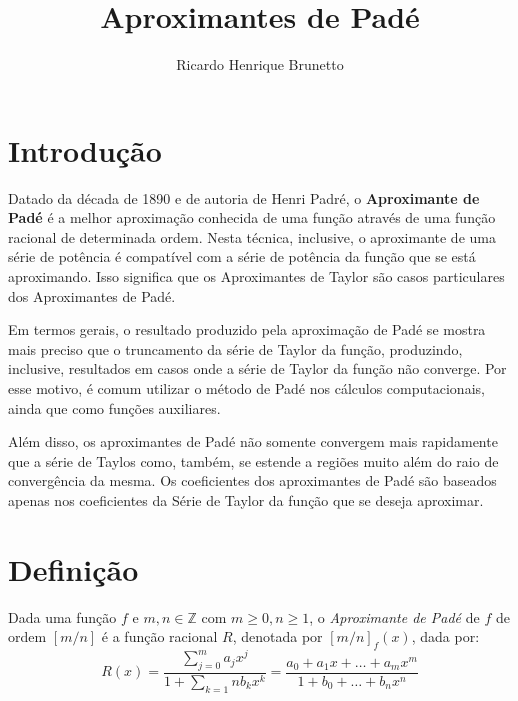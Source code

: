 

\sloppy

\title{Aproximantes de Padé}

\author{Ricardo Henrique Brunetto}

\address{Departamento de Informática -- Universidade Estadual de Maringá (UEM)\\
	Maringá -- PR -- Brasil
}



	\maketitle

  \section{Introdução}

	Datado da década de 1890 e de autoria de Henri Padré,  o \textbf{Aproximante de Padé} é
	a melhor aproximação conhecida  de uma função através de uma função racional de determinada ordem.
	Nesta técnica, inclusive, o aproximante de uma série de potência é compatível com a série de potência
	da função que se está aproximando. Isso significa que os Aproximantes de Taylor são casos particulares dos Aproximantes
	de Padé.

	Em termos gerais, o resultado produzido pela aproximação de Padé se mostra mais preciso
	que o truncamento da série de Taylor da função, produzindo, inclusive, resultados em casos
	onde a série de Taylor da função não converge. Por esse motivo, é comum utilizar o método de
	Padé nos cálculos computacionais, ainda que como funções auxiliares.

	Além disso, os aproximantes de Padé não somente convergem mais rapidamente que a série de Taylos como,
	também, se estende a regiões muito além do raio de convergência da mesma. Os coeficientes dos aproximantes
	de Padé são baseados apenas nos coeficientes da Série de Taylor da função que se deseja aproximar.

	\section{Definição}
	Dada uma função $f$ e $m,n \in \mathbb{Z}$ com $m\geq0, n\geq1$, o \textit{Aproximante de Padé}
	de $f$ de ordem $[m/n]$ é a função racional $R$, denotada por $[m/n]_f(x)$, dada por:
	$$R(x) = \frac{\sum_{j=0}^{m}{a_jx^j}}{1 + \sum_{k=1}{n}{b_kx^k}} = \frac{a_0 + a_1x + \dots + a_mx^m}{1 + b_0 + \dots + b_nx^n}$$

